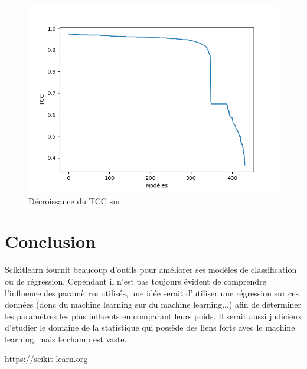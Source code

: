 \documentclass[10pt,letterpaper]{article}
\begin{document}
\begin{figure}[H]
\centering
\includegraphics[scale=0.65]{images/dj_pmc_2.png}
\caption{Décroissance du TCC sur\protect{}}
\end{figure}

\section*{Conclusion}

Scikitlearn fournit beaucoup d’outils pour améliorer ses modèles de classification ou de régression. Cependant il n’est pas toujours évident de comprendre l’influence des paramètres utilisés, une idée serait d’utiliser une régression sur ces données (donc du machine learning sur du machine learning...) afin de déterminer les paramètres les plus influents en comparant leurs poids. Il serait aussi judicieux d’étudier le domaine de la statistique qui possède des liens forts avec le machine learning, mais le champ est vaste...

%
%
% 
\vspace{15mm}
\begin{thebibliography}{10}

\url{https://scikit-learn.org}

\end{thebibliography}
\end{document}
